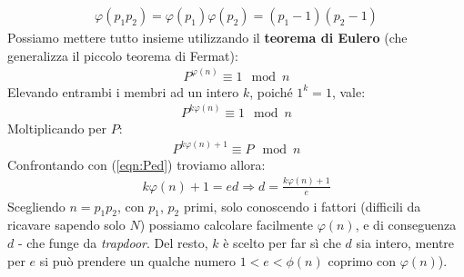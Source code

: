 \documentclass[../../InformazioneQuantistica.tex]{subfiles}
\begin{document}
\begin{expl}
\begin{align*}
    \varphi(p_1 p_2) = \varphi(p_1)\varphi(p_2)=(p_1-1)(p_2-1)
\end{align*}
Possiamo mettere tutto insieme utilizzando il \textbf{teorema di Eulero} (che generalizza il piccolo teorema di Fermat):
\begin{align*}
    P^{\varphi(n)} \equiv 1 \mod n
\end{align*}
Elevando entrambi i membri ad un intero $k$, poiché $1^k = 1$, vale:
\begin{align*}
    P^{k\varphi(n)} \equiv 1 \mod n
\end{align*}
Moltiplicando per $P$:
\begin{align*}
    P^{k\varphi(n)+1} \equiv P \mod n
\end{align*}
Confrontando con (\ref{eqn:Ped}) troviamo allora:
\begin{align*}
    k\varphi(n)+1 = ed \Rightarrow d = \frac{k\varphi(n)+1}{e}
\end{align*}
Scegliendo $n=p_1 p_2$, con $p_1$, $p_2$ primi, solo conoscendo i fattori (difficili da ricavare sapendo solo $N$) possiamo calcolare facilmente $\varphi(n)$, e di conseguenza $d$ - che funge da \textit{trapdoor}. Del resto, $k$ è scelto per far sì che $d$ sia intero, mentre per $e$ si può prendere un qualche numero $1< e < \phi(n)$ coprimo con $\varphi(n)$).
\end{expl}
\end{document}
